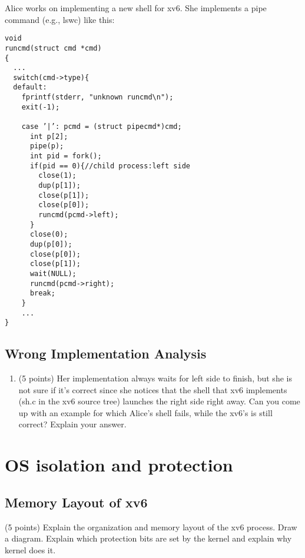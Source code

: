 \documentclass[]{article}
\providecommand{\tightlist}{%
  \setlength{\itemsep}{0pt}\setlength{\parskip}{0pt}}
\begin{document}
Alice works on implementing a new shell for xv6. She implements a pipe
command (e.g., ls\textbar{}wc) like this:

\begin{verbatim}
void
runcmd(struct cmd *cmd)
{
  ...
  switch(cmd->type){
  default:
    fprintf(stderr, "unknown runcmd\n");
    exit(-1);
    
    case ’|’: pcmd = (struct pipecmd*)cmd;
      int p[2];
      pipe(p);
      int pid = fork();
      if(pid == 0){//child process:left side
        close(1);
        dup(p[1]);
        close(p[1]);
        close(p[0]);
        runcmd(pcmd->left);
      }
      close(0);
      dup(p[0]);
      close(p[0]);
      close(p[1]);
      wait(NULL);
      runcmd(pcmd->right);
      break;
    }
    ...
}
\end{verbatim}

\hypertarget{wrong-implementation-analysis}{%
\subsection{Wrong Implementation
Analysis}\label{wrong-implementation-analysis}}

\begin{enumerate}
\def\labelenumi{(\alph{enumi})}
\tightlist
\item
  (5 points) Her implementation always waits for left side to finish,
  but she is not sure if it's correct since she notices that the shell
  that xv6 implements (sh.c in the xv6 source tree) launches the right
  side right away. Can you come up with an example for which Alice's
  shell fails, while the xv6's is still correct? Explain your answer.
\end{enumerate}

\hypertarget{os-isolation-and-protection}{%
\section{OS isolation and
protection}\label{os-isolation-and-protection}}

\hypertarget{memory-layout-of-xv6}{%
\subsection{Memory Layout of xv6}\label{memory-layout-of-xv6}}

(5 points) Explain the organization and memory layout of the xv6
process. Draw a diagram. Explain which protection bits are set by the
kernel and explain why kernel does it.
\end{document}
